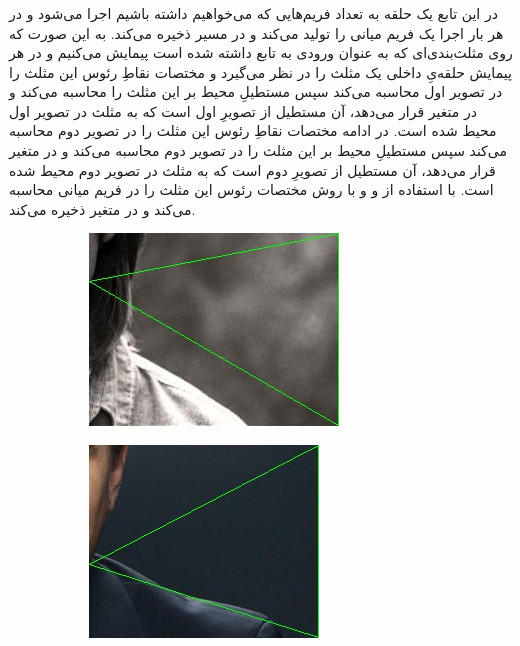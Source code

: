 \documentclass[a4paper,12pt]{article}
\begin{document}
\subsubsection*{}
در این تابع یک حلقه به تعداد فریم‌هایی که می‌خواهیم داشته باشیم اجرا می‌شود و در هر بار اجرا یک فریم میانی را تولید می‌کند و در مسیر
ذخیره می‌کند. به این صورت که روی مثلث‌بندی‌ای که به عنوان ورودی به تابع داشته شده است پیمایش می‌کنیم و در هر پیمایش حلقه‌یِ داخلی یک مثلث را در نظر‌ می‌گیرد و مختصات نقاطِ رئوس این مثلث را در تصویر اول محاسبه می‌کند سپس مستطیلِ محیط بر این مثلث را محاسبه می‌کند و در متغیر 
قرار می‌دهد، 
آن مستطیل از تصویرِ اول است که به مثلث در تصویر اول محیط شده است. در ادامه مختصات نقاطِ رئوس این مثلث را در تصویر دوم محاسبه می‌کند سپس مستطیلِ محیط بر این مثلث را در تصویر دوم محاسبه می‌کند و در متغیر 
قرار می‌دهد، 
آن مستطیل از تصویرِ دوم است که به مثلث در تصویر دوم محیط شده است. با استفاده از 
و
و با روش 
مختصات رئوس این مثلث را در فریم میانی محاسبه ‌می‌کند و در متغیر 
ذخیره می‌کند.
\begin{figure}[H]
	\centering
	\begin{subfigure}{0.5\textwidth}
		\centering
		\includegraphics[width=.5\textwidth]{cropped_face1_triangle_boundary.jpg}
	\end{subfigure}%
	\begin{subfigure}{0.5\textwidth}
		\centering
		\includegraphics[width=.5\textwidth]{cropped_face2_triangle_boundary.jpg}
	\end{subfigure}%
	
\end{figure}
\end{document}
